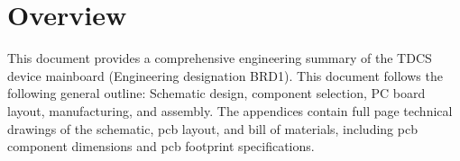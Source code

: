\section*{Overview}
This document provides a comprehensive engineering summary of the TDCS device mainboard (Engineering designation BRD1). This document follows the following general outline: Schematic design, component selection, PC board layout, manufacturing, and assembly. The appendices contain full page technical drawings of the schematic, pcb layout, and bill of materials, including pcb component dimensions and pcb footprint specifications. 